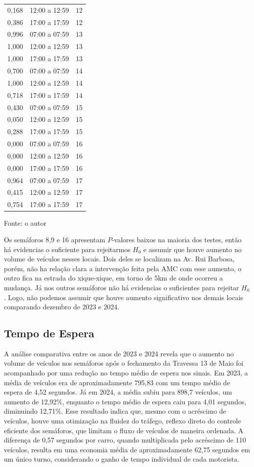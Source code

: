 \begin{supertabular}{ccc}
0,168 & 12:00 a 12:59 & 12 \\
0,386 & 17:00 a 17:59 & 12 \\
0,996 & 07:00 a 07:59 & 13 \\
1,000 & 12:00 a 12:59 & 13 \\
1,000 & 17:00 a 17:59 & 13 \\
0,700 & 07:00 a 07:59 & 14 \\
1,000 & 12:00 a 12:59 & 14 \\
0,718 & 17:00 a 17:59 & 14 \\
0,430 & 07:00 a 07:59 & 15 \\
0,050 & 12:00 a 12:59 & 15 \\
0,288 & 17:00 a 17:59 & 15 \\
0,000 & 07:00 a 07:59 & 16 \\
0,000 & 12:00 a 12:59 & 16 \\
0,000 & 17:00 a 17:59 & 16 \\
0,964 & 07:00 a 07:59 & 17 \\
0,415 & 12:00 a 12:59 & 17 \\
0,754 & 17:00 a 17:59 & 17 \\
\end{supertabular}




\begin{center}
    \footnotesize Fonte: o autor
\end{center}
\justifying

Os semáforos 8,9 e 16 apresentam \(P\)-valores baixos na maioria dos testes, então há evidencias o suficiente para rejeitarmos \(H_0\) e assumir que houve aumento no volume de veículos nesses locais. Dois deles se localizam na Av. Rui Barbosa, porém, não ha relação clara a intervenção feita pela AMC com esse aumento, o outro fica na estrada do xique-xique, em torno de 5km de onde ocorreu a mudança. Já nos outros semáforos não há evidencias o suficientes para rejeitar \(H_0\). Logo, não podemos assumir que houve aumento significativo nos demais locais comparando dezembro de 2023 e 2024.


\subsection{Tempo de Espera}
A análise comparativa entre os anos de 2023 e 2024 revela que o aumento no volume de veículos nos semáforos após o fechamento da Travessa 13 de Maio foi acompanhado por uma redução no tempo médio de espera nos sinais. Em 2023, a média de veículos era de aproximadamente 795,83 com um tempo médio de espera de 4,52 segundos. Já em 2024, a média subiu para 898,7 veículos, um aumento de 12,92\%, enquanto o tempo médio de espera caiu para 4,01 segundos, diminuindo 12,71\%. Esse resultado indica que, mesmo com o acréscimo de veículos, houve uma otimização na fluidez do tráfego, reflexo direto do controle eficiente dos semáforos, que limitam o fluxo de veículos de maneira ordenada. A diferença de 0,57 segundos por carro, quando multiplicada pelo acréscimo de 110 veículos, resulta em uma economia média de aproximadamente 62,75 segundos em um único turno, considerando o ganho de tempo individual de cada motorista.

